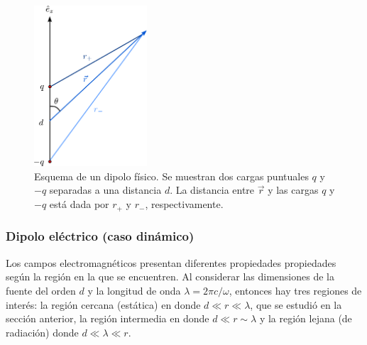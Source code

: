 \begin{figure}[h!]
	\centering
	\includegraphics[width=4.2cm]{../../Figuras/aproxdipolar}
	\caption{Esquema de un dipolo físico. Se muestran dos cargas puntuales $q$ y $-q$ separadas a una distancia $d$. La distancia entre $\Vec{r}$ y las cargas $q$ y $-q$ está dada por $r_+$ y $r_{-}$, respectivamente. }
	\label{dipolo_elec}
\end{figure}

\subsubsection{Dipolo eléctrico (caso dinámico)}
Los campos electromagnéticos presentan diferentes propiedades propiedades según la región en la que se encuentren. Al considerar las dimensiones de la fuente  del orden $d$ y la longitud de onda $\lambda=2\pi c/\omega$, entonces hay tres regiones de interés: la región cercana (estática) en donde $d\ll r\ll\lambda$, que se estudió en la sección anterior, la región intermedia en donde $d\ll r\sim \lambda$ y la región lejana (de radiación) donde $d\ll \lambda\ll r$.

